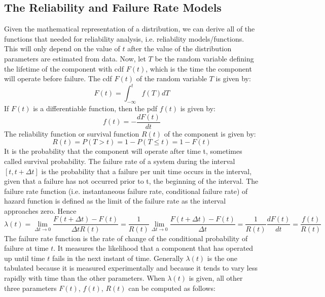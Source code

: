 \subsection{The Reliability and Failure Rate Models}
Given the mathematical representation of a distribution, we can derive all of the functions that needed
for reliability analysis, i.e. reliability models/functions. This will only depend on the value of $t$
after the value of the distribution parameters are estimated from data.
Now, let $T$ be the random variable defining the lifetime of the component with cdf $F(t)$, which is the
time the component will operate before failure. The cdf $F(t)$ of the random variable $T$ is given by:
\begin{equation}
  F(t) = \int_{-\infty}^{t} f(T)dT
\end{equation}
If $F(t)$ is a differentiable function, then the pdf $f(t)$ is given by:
\begin{equation}
  f(t) = - \frac{dF(t)}{dt}
\end{equation}
The reliability function or survival function $R(t)$ of the component is given by:
\begin{equation}
  R(t) = P(T>t) = 1 - P(T\leq t) = 1-F(t)
\end{equation}
It is the probability that the component will operate after time t, sometimes called survival probability.
The failure rate of a system during the interval $[t,t+\Delta t]$ is the probability that a failure per
unit time occurs in the interval, given that a failure has not occurred prior to t, the beginning of the
interval. The failure rate function (i.e. instantaneous failure rate, conditional failure rate) of hazard
function is defined as the limit of the failure rate as the interval approaches zero. Hence
\begin{equation}
  \lambda (t)= \lim_{\Delta t\rightarrow 0} \frac{F(t+\Delta t) - F(t)}{\Delta tR(t)}
	 = \frac{1}{R(t)} \lim_{\Delta t\rightarrow 0} \frac{F(t+\Delta t) - F(t)}{\Delta t}
	 = \frac{1}{R(t)}\frac{dF(t)}{dt} = \frac{f(t)}{R(t)}
\end{equation}
The failure rate function is the rate of change of the conditional probability of failure at time $t$.
It measures the likelihood that a component that has operated up until time $t$ fails in the next
instant of time.
Generally $\lambda (t)$ is the one tabulated because it is measured experimentally and because it tends to
vary less rapidly with time than the other parameters. When $\lambda (t)$ is given, all other three
parameters $F(t)$, $f(t)$, $R(t)$ can be computed as follows:
